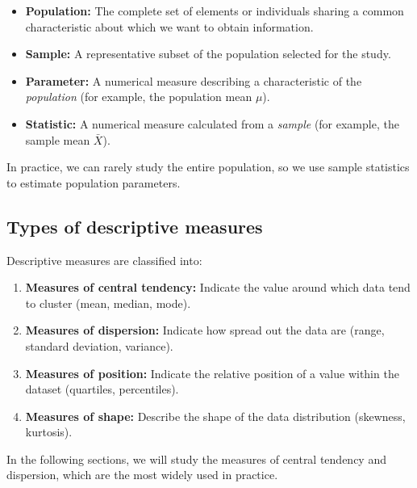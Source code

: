 \begin{definition}
	\begin{itemize}
		\item \textbf{Population:} The complete set of elements or individuals sharing a common characteristic about which we want to obtain information.
		\item \textbf{Sample:} A representative subset of the population selected for the study.
	\end{itemize}
\end{definition}

\begin{definition}
	\begin{itemize}
		\item \textbf{Parameter:} A numerical measure describing a characteristic of the \emph{population} (for example, the population mean $\mu$).
		\item \textbf{Statistic:} A numerical measure calculated from a \emph{sample} (for example, the sample mean $\bar{X}$).
	\end{itemize}
\end{definition}

\begin{remark}
	In practice, we can rarely study the entire population, so we use sample statistics to estimate population parameters.
\end{remark}

\subsection{Types of descriptive measures}

Descriptive measures are classified into:

\begin{enumerate}
	\item \textbf{Measures of central tendency:} Indicate the value around which data tend to cluster (mean, median, mode).
	\item \textbf{Measures of dispersion:} Indicate how spread out the data are (range, standard deviation, variance).
	\item \textbf{Measures of position:} Indicate the relative position of a value within the dataset (quartiles, percentiles).
	\item \textbf{Measures of shape:} Describe the shape of the data distribution (skewness, kurtosis).
\end{enumerate}

In the following sections, we will study the measures of central tendency and dispersion, which are the most widely used in practice.
